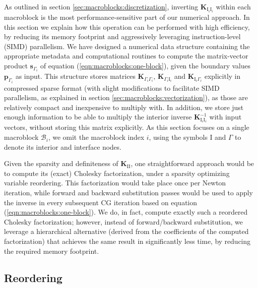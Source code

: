 As outlined in section \ref{sec:macroblocks:discretization}, inverting
$\mathbf{K}_{\mathrm{I}_i\mathrm{I}_i}$ within each macroblock is the
most performance-sensitive part of our numerical approach. In this
section we explain how this operation can be performed with high
efficiency, by reducing its memory footprint and aggressively
leveraging instruction-level (SIMD) parallelism. We have designed a
numerical data structure containing the appropriate metadata and
computational routines to compute the matrix-vector product
$\mathbf{s}_{\Gamma_i}$ of equation (\ref{eqn:macroblocks:one-block}), given the
boundary values $\mathbf{p}_{\Gamma_i}$ as input. This structure
stores matrices $\mathbf{K}_{\Gamma_i\Gamma_i}$,
$\mathbf{K}_{\Gamma_i\mathrm{I}_i}$ and
$\mathbf{K}_{\mathrm{I}_i\Gamma_i}$ explicitly in compressed sparse
format (with slight modifications to facilitate SIMD parallelism, as
explained in section \ref{sec:macroblocks:vectorization}), as those are relatively
compact and inexpensive to multiply with. In addition, we store just
enough information to be able to multiply the interior inverse
$\mathbf{K}_{\mathrm{I}_i\mathrm{I}_i}^{-1}$ with input vectors,
without storing this matrix explicitly. As this section focuses on a
single macroblock $\mathcal{B}_i$, we omit the macroblock index $i$,
using the symbols $\mathrm{I}$ and $\Gamma$ to denote its interior and
interface nodes.

Given the sparsity and definiteness of
$\mathbf{K}_{\mathrm{I}\mathrm{I}}$, one straightforward approach
would be to compute its (exact) Cholesky factorization, under a
sparsity optimizing variable reordering. This factorization would take
place once per Newton iteration, while forward and backward
substitution passes would be used to apply the inverse in every
subsequent CG iteration based on equation (\ref{eqn:macroblocks:one-block}). We
do, in fact, compute exactly such a reordered Cholesky factorization;
however, instead of forward/backward substitution, we leverage a
hierarchical alternative (derived from the coefficients of the
computed factorization) that achieves the same result in significantly
less time, by reducing the required memory footprint.

\subsection{Reordering}

